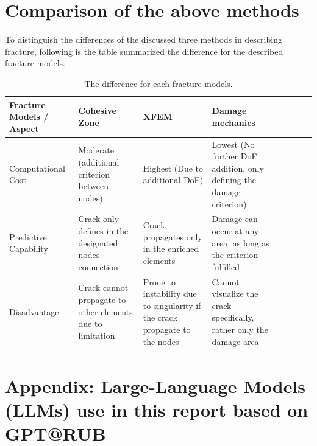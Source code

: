 \documentclass[12pt]{article}
\begin{document}
\section{Comparison of the above methods}
\hspace{1em}To distinguish the differences of the discussed three methods in describing fracture, following is the table summarized the difference for the described fracture models.

\begin{table}[h!]
    \centering
    \caption{The difference for each fracture models.}
    \label{tab:FractureDifferences}
    \begin{tabularx}{\textwidth}{l *{7}{>{\centering\arraybackslash}X}}
        \toprule
        Fracture Models / Aspect & Cohesive Zone & XFEM & Damage mechanics \\
        \midrule
        Computational Cost & Moderate (additional criterion between nodes) & Highest (Due to additional DoF) & Lowest (No further DoF addition, only defining the damage criterion) \\
        Predictive Capability & Crack only defines in the designated nodes connection & Crack propagates only in the enriched elements & Damage can occur at any area, as long as the criterion fulfilled \\
        Disadvantage & Crack cannot propagate to other elements due to limitation & Prone to instability due to singularity if the crack propagate to the nodes & Cannot visualize the crack specifically, rather only the damage area  \\
        \bottomrule
    \end{tabularx}
\end{table}

\newpage
\printbibliography

\newpage
\section*{Appendix: Large-Language Models (LLMs) use in this report based on GPT@RUB}


\end{document}
